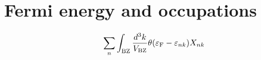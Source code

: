 \documentclass[letterpaper,10pt,pdftex,openany,english]{sphinxmanual}
\begin{document}
\section{Fermi energy and occupations}
\label{\detokenize{routine:fermi-energy-and-occupations}}\begin{equation*}
\begin{split}\begin{align}
\sum_{n}
\int_{\rm BZ} \frac{d^3 k}{V_{\rm BZ}}
\theta(\varepsilon_{\rm F} -
\varepsilon_{n k}) X_{n k}
\end{align}\end{split}
\end{equation*}
\begin{sphinxVerbatim}[commandchars=\\\{\}]
\end{sphinxVerbatim}
\end{document}
